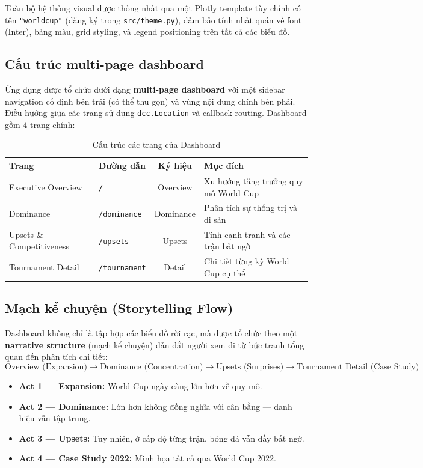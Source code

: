 \documentclass[12pt,a4paper]{article}
\begin{document}
Toàn bộ hệ thống visual được thống nhất qua một Plotly template tùy chỉnh có tên \texttt{"worldcup"} (đăng ký trong \texttt{src/theme.py}), đảm bảo tính nhất quán về font (Inter), bảng màu, grid styling, và legend positioning trên tất cả các biểu đồ.

\subsection{Cấu trúc multi-page dashboard}
Ứng dụng được tổ chức dưới dạng \textbf{multi-page dashboard} với một sidebar navigation cố định bên trái (có thể thu gọn) và vùng nội dung chính bên phải. Điều hướng giữa các trang sử dụng \texttt{dcc.Location} và callback routing. Dashboard gồm 4 trang chính:

\begin{table}[H]
\centering
\caption{Cấu trúc các trang của Dashboard}
\label{tab:pages_structure}
\begin{tabular}{llcp{7.5cm}}
\toprule
\textbf{Trang} & \textbf{Đường dẫn} & \textbf{Ký hiệu} & \textbf{Mục đích} \\
\midrule
Executive Overview & \texttt{/} & Overview & Xu hướng tăng trưởng quy mô World Cup \\
Dominance & \texttt{/dominance} & Dominance & Phân tích sự thống trị và di sản \\
Upsets \& Competitiveness & \texttt{/upsets} & Upsets & Tính cạnh tranh và các trận bất ngờ \\
Tournament Detail & \texttt{/tournament} & Detail & Chi tiết từng kỳ World Cup cụ thể \\
\bottomrule
\end{tabular}
\end{table}

\subsection{Mạch kể chuyện (Storytelling Flow)}
Dashboard không chỉ là tập hợp các biểu đồ rời rạc, mà được tổ chức theo một \textbf{narrative structure} (mạch kể chuyện) dẫn dắt người xem đi từ bức tranh tổng quan đến phân tích chi tiết:
\[
\text{Overview (Expansion)} \rightarrow \text{Dominance (Concentration)} \rightarrow \text{Upsets (Surprises)} \rightarrow \text{Tournament Detail (Case Study)}
\]
\begin{itemize}
    \item \textbf{Act 1 --- Expansion:} World Cup ngày càng lớn hơn về quy mô.
    \item \textbf{Act 2 --- Dominance:} Lớn hơn không đồng nghĩa với cân bằng --- danh hiệu vẫn tập trung.
    \item \textbf{Act 3 --- Upsets:} Tuy nhiên, ở cấp độ từng trận, bóng đá vẫn đầy bất ngờ.
    \item \textbf{Act 4 --- Case Study 2022:} Minh họa tất cả qua World Cup 2022.
\end{itemize}
\end{document}
